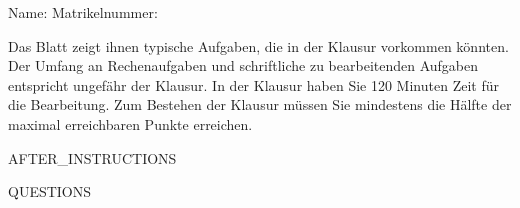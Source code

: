 \documentclass[addpoints]{exam}
\begin{document}
\vspace{0.2in}
Name:\enspace\hrulefill
\hspace{0.2in}
Matrikelnummer:\enspace\hrulefill

\vspace{0.2in}

\begin{center}
    \centering
    Das Blatt zeigt ihnen typische Aufgaben, die in der Klausur vorkommen könnten. Der Umfang an
    Rechenaufgaben und schriftliche zu bearbeitenden Aufgaben entspricht ungefähr der Klausur.
    In der Klausur haben Sie 120 Minuten Zeit für die Bearbeitung.
    Zum Bestehen der Klausur müssen Sie mindestens die Hälfte der maximal erreichbaren Punkte erreichen.
\end{center}

\vspace{0.2in}

{{AFTER_INSTRUCTIONS}}

{{QUESTIONS}}
\end{document}

